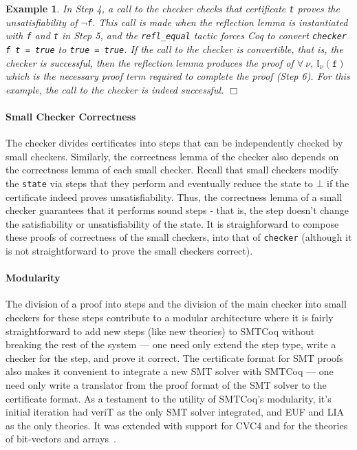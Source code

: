 \documentclass[11pt]{article}
\newtheorem{example}{Example}[section]
\newcommand{\intr}[1]{\mathbb{I}_{\nu}(#1)}
\begin{document}
\begin{example}
		In Step 4, a call to the checker 
		checks that certificate \texttt{t} 
		proves the unsatisfiability of 
		\texttt{$\neg$f}. This call is made
		when the reflection lemma 
		is instantiated with \texttt{f} and 
		\texttt{t} in Step 5, and the 
		\texttt{refl\_equal} tactic forces 
		Coq to convert 
		\texttt{checker f t = true} to 
		\texttt{true = true}. If the call to the 
		checker is convertible, that is,
		the checker is successful, then 
		the reflection lemma produces 
		the proof of 
		$\forall\ \nu,\ \intr{\texttt{f}}$
		which is the necessary proof term 
		required to complete the proof 
		(Step 6). For 
		this example, the call to the 
		checker is indeed successful.
		\hfill $\Box$
	\end{example}

	\paragraph{Small Checker Correctness}
	The checker divides certificates
	into steps that can be independently 
	checked by small checkers.
	Similarly, the correctness lemma
	of the checker also depends on 
	the correctness lemma of each 
	small checker. Recall that 
	small checkers modify the 
	\texttt{state} via steps that 
	they perform and eventually
	reduce the state to $\bot$ if 
	the certificate indeed proves
	unsatisfiability.  Thus, the 
	correctness lemma of a small 
	checker guarantees that it
	performs sound steps - that is,
	the step doesn't change the 
	satisfiability or unsatisfiability
	of the state. It is straighforward
	to compose these proofs 
	of correctness of the small 
	checkers, into that of
	\texttt{checker} (although
	it is not straightforward 
	to prove the small checkers 
	correct). 
	
	\paragraph{Modularity} The division 
	of a proof into steps and 
	the division of the main 
	checker into small checkers for these
	steps contribute to a 
	modular architecture where it 
	is fairly straightforward to 
	add new steps (like new theories)
	to SMTCoq without breaking 
	the rest of the system --- one 
	need only extend the step type,
	write a checker for the step, 
	and prove it correct. The 
	certificate format for SMT
	proofs also makes it 
	convenient to integrate a 
	new SMT solver with SMTCoq
	--- one need only write a translator
	from the proof format of the SMT
	solver to the certificate format. 
	As a testament to the utility of
	SMTCoq's modularity, it's 
	initial iteration had veriT as 
	the only SMT solver integrated, 
	and EUF and LIA as the only 
	theories. It was extended 
	with support for CVC4 and 
	for the theories of 
	bit-vectors and 
	arrays~\cite{DBLP:journals/corr/EkiciKKMRT16}.
	
\end{document}
